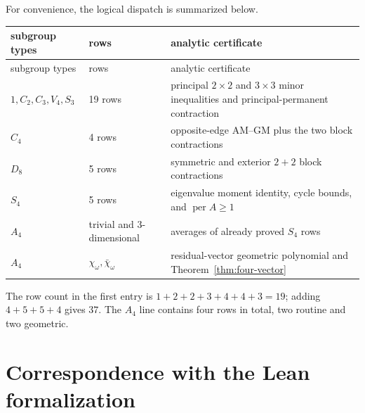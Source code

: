 \documentclass[11pt]{article}
\theoremstyle{definition}
\newcommand{\per}{\operatorname{per}}
\begin{document}
For convenience, the logical dispatch is summarized below.
\begin{longtable}{@{}p{}p{}p{}@{}}
\toprule
subgroup types & rows & analytic certificate\\
\midrule
\endfirsthead
\toprule
subgroup types & rows & analytic certificate\\
\midrule
\endhead
$1,C_2,C_3,V_4,S_3$ & 19 rows & principal $2\times2$ and $3\times3$
minor inequalities and principal-permanent contraction\\
$C_4$ & 4 rows & opposite-edge AM--GM plus the two block contractions\\
$D_8$ & 5 rows & symmetric and exterior $2+2$ block contractions\\
$S_4$ & 5 rows & eigenvalue moment identity, cycle bounds, and
$\per A\geq1$\\
$A_4$ & trivial and $3$-dimensional & averages of already proved $S_4$ rows\\
$A_4$ & $\chi_\omega,\bar\chi_\omega$ & residual-vector geometric
polynomial and Theorem~\ref{thm:four-vector}\\
\bottomrule
\end{longtable}

The row count in the first entry is
$1+2+2+3+4+4+3=19$; adding $4+5+5+4$ gives $37$.  The $A_4$ line contains
four rows in total, two routine and two geometric.

\section{Correspondence with the Lean formalization}
\end{document}

